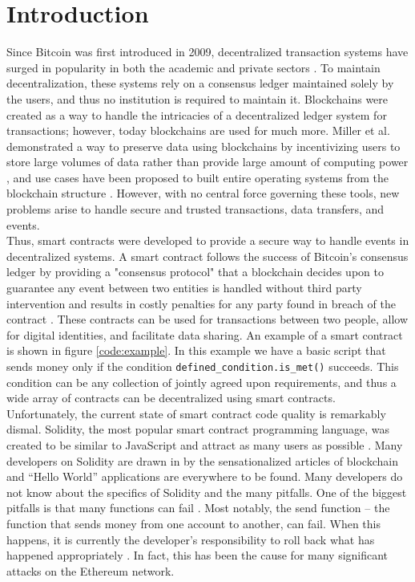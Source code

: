 \section{Introduction}

Since Bitcoin was first introduced in 2009, decentralized transaction systems have surged in popularity in both the academic and private sectors \cite{nakamoto2008bitcoin}. To maintain decentralization, these systems rely on a consensus ledger maintained solely by the users, and thus no institution is required to maintain it. Blockchains were created as a way to handle the intricacies of a decentralized ledger system for transactions; however, today blockchains are used for much more. Miller et al. demonstrated a way to preserve data using blockchains by incentivizing users to store large volumes of data rather than provide large amount of computing power \cite{miller2014permacoin}, and use cases have been proposed to built entire operating systems from the blockchain structure \cite{factombos,tapscott2016blockchain}. However, with no central force governing these tools, new problems arise to handle secure and trusted transactions, data transfers, and events. \\

Thus, smart contracts were developed to provide a secure way to handle events in decentralized systems. A smart contract follows the success of Bitcoin's consensus ledger by providing a "consensus protocol" that a blockchain decides upon to guarantee any event between two entities is handled without third party intervention and results in costly penalties for any party found in breach of the contract \cite{szabo1997idea, luu2016making,daian2016dao}. These contracts can be used for transactions between two people, allow for digital identities, and facilitate data sharing. An example of a smart contract is shown in figure \ref{code:example}. In this example we have a basic script that sends money only if the condition \texttt{defined\_condition.is\_met()} succeeds. This condition can be any collection of jointly agreed upon requirements, and thus a wide array of contracts can be decentralized using smart contracts. \\

Unfortunately, the current state of smart contract code quality is remarkably dismal. Solidity, the most popular smart contract programming language, was created to be similar to JavaScript and attract as many users as possible \cite{bartolettipompianuanalysis, systematicstudy}. Many developers on Solidity are drawn in by the sensationalized articles of blockchain and ``Hello World'' applications are everywhere to be found. Many developers do not know about the specifics of Solidity and the many pitfalls. One of the biggest pitfalls is that many functions can fail \cite{systematicstudy}. Most notably, the send function -- the function that sends money from one account to another, can fail. When this happens, it is currently the developer's responsibility to roll back what has happened appropriately \cite{luu2016making}. In fact, this has been the cause for many significant attacks on the Ethereum network. \\


